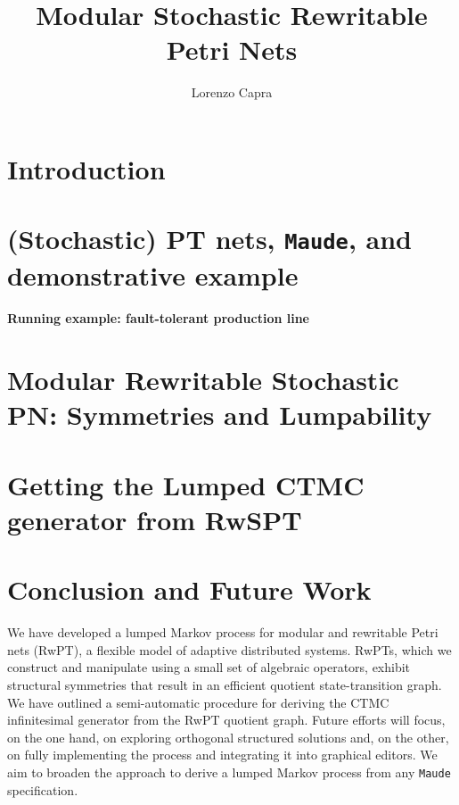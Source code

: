 \documentclass[submission,copyright,creativecommons]{eptcs}
\begin{document}
\title{Modular Stochastic Rewritable Petri Nets}

\author{Lorenzo Capra
}

\def\titlerunning{Modular Stochastic Rewritable Petri Nets}
\def\authorrunning{Lorenzo Capra}

\maketitle



\section{Introduction}
\label{sec:intro}


\section{(Stochastic) PT nets, \texttt{Maude}, and demonstrative example}
\label{sec:backgr}


\paragraph{Running example: fault-tolerant production line}
\label{sec:exe}



\section{Modular Rewritable Stochastic PN: Symmetries and Lumpability}
\label{sec:rewPT}


\section{Getting the Lumped CTMC generator from RwSPT}
\label{sec:CTMC}



\section{Conclusion and Future Work}
We have developed a lumped Markov process for modular and rewritable Petri nets (RwPT), a flexible model of adaptive distributed systems.
RwPTs, which we construct and manipulate using a small set of algebraic operators, exhibit structural symmetries that result in an efficient quotient state-transition graph.
We have outlined a semi-automatic procedure for deriving the CTMC infinitesimal generator from the RwPT quotient graph. Future efforts will focus, on the one hand, on exploring orthogonal structured solutions and, on the other, on fully implementing the process and integrating it into graphical editors.
We aim to broaden the approach
to derive a lumped Markov process 
from any \texttt{Maude} specification.




\end{document}
